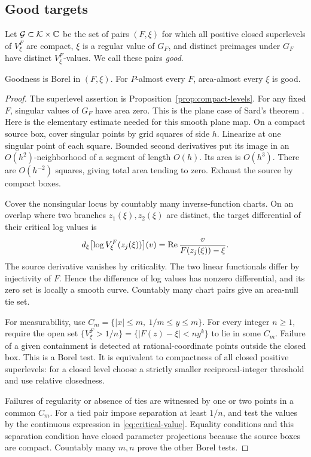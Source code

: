 \subsection{Good targets}

Let \(\mathcal G\subset\mathcal K\times\mathbb C\) be the set of pairs
\((F,\xi)\) for which all positive closed superlevels
of \(V_\xi^F\) are compact, \(\xi\) is a regular value of \(G_F\),
and distinct preimages under \(G_F\) have distinct \(V_\xi^F\)-values.
We call these pairs \emph{good}.

\begin{lemma}\label{lem:good}
Goodness is Borel in \((F,\xi)\). For \(P\)-almost every \(F\),
area-almost every \(\xi\) is good.
\end{lemma}
\begin{proof}
The superlevel assertion is Proposition~\ref{prop:compact-levels}.
For any fixed \(F\), singular values of \(G_F\) have area zero.
This is the plane case of Sard's theorem \cite[Theorem 4.1]{Sard}.
Here is the elementary estimate needed for this smooth plane map.
On a compact source box, cover singular points by grid squares
of side \(h\). Linearize at one singular point of each square.
Bounded second derivatives put its image in an \(O(h^2)\)-neighborhood
of a segment of length \(O(h)\). Its area is \(O(h^3)\).
There are \(O(h^{-2})\) squares, giving total area tending to zero.
Exhaust the source by compact boxes.

Cover the nonsingular locus by countably many inverse-function
charts. On an overlap where two branches \(z_1(\xi),z_2(\xi)\)
are distinct, the target differential of their critical log values is
\[
 d_\xi\bigl[\log V_\xi^F(z_j(\xi))\bigr](v)
 =\operatorname{Re}\frac{v}{F(z_j(\xi))-\xi}.
\]
The source derivative vanishes by criticality.
The two linear functionals differ by injectivity of \(F\).
Hence the difference of log values has nonzero differential, and
its zero set is locally a smooth curve. Countably many chart pairs
give an area-null tie set.

For measurability, use
\(C_m=\{|x|\le m,\ 1/m\le y\le m\}\).
For every integer \(n\ge1\), require the open set
\(\{V_\xi^F>1/n\}=\{|F(z)-\xi|<ny^k\}\) to lie in some \(C_m\).
Failure of a given containment is detected at rational-coordinate
points outside the closed box. This is a Borel test.
It is equivalent to compactness of all closed positive superlevels:
for a closed level choose a strictly smaller reciprocal-integer
threshold and use relative closedness.

Failures of regularity or absence of ties are witnessed by one or
two points in a common \(C_m\). For a tied pair impose separation
at least \(1/n\), and test the values by the continuous expression
in \eqref{eq:critical-value}. Equality conditions and this separation
condition have closed parameter projections because the source
boxes are compact. Countably many \(m,n\) prove the other Borel tests.
\end{proof}

